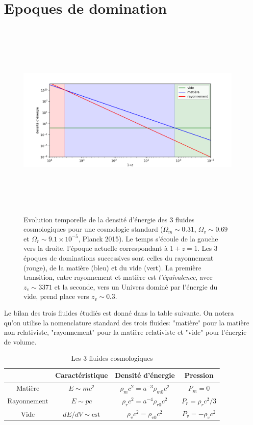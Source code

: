 \section{Epoques de domination}
\begin{figure}[htbp]
	\centering
		\includegraphics[height=10cm]{figs/era.png}
	\caption[Epoques de domination des fluides cosmiques]{Evolution temporelle de la densité d'énergie des 3 fluides cosmologiques pour une cosmologie standard ($\Omega_m \sim 0.31$, $\Omega_v \sim 0.69$ et $\Omega_r\sim 9.1\times 10^{-5}$, Planck 2015). Le temps s'écoule de la gauche vers la droite, l'époque actuelle correspondant à $1+z=1$. Les 3 époques de dominations successives sont celles du rayonnement (rouge), de la matière (bleu) et du vide (vert). La première transition, entre rayonnement et matière est \textit{ l'équivalence}, avec $z_e\sim 3371$ et la seconde, vers un Univers dominé par l'énergie du vide, prend place vers $z_v \sim 0.3$. }
	\label{f:era}
\end{figure}
Le bilan des trois fluides étudiés est donné dans la table suivante. On notera qu'on utilise la nomenclature standard des trois fluides: "matière" pour la matière non relativiste, "rayonnement" pour la matière relativiste et "vide" pour l'énergie de volume.
\begin{table}[h]
\begin{center}
\begin{tabular}{|c|c|c|c|}
\hline 
 & Caractéristique & Densité d'énergie & Pression \\ 
\hline 
Matière & $E\sim mc^2$ & $\rho_mc^2 =a^{-3}\rho_{m0}c^2$& $P_m=0$\\ 
\hline 
Rayonnement & $E\sim pc$ & $\rho_rc^2 =a^{-4}\rho_{r0}c^2$ & $P_r=\rho_rc^2/3$ \\ 
\hline 
Vide & $dE/dV\sim \mathrm{cst}$ & $\rho_vc^2 =\rho_{v0}c^2$ & $P_v=-\rho_vc^2$ \\ 
\hline 
\end{tabular} 
\end{center}
\caption{Les 3 fluides cosmologiques}
\end{table}

